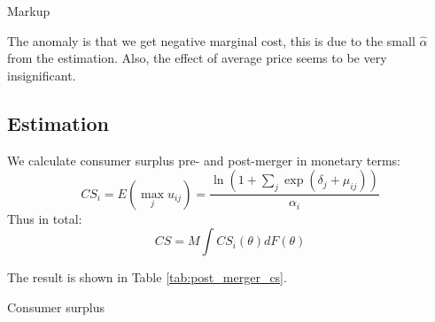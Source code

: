\documentclass[12pt]{article}[margin=1in]
\begin{document}
\begin{table}[h!]
    \fontsize{10pt}{12pt}\selectfont
    \centering
    
    \caption{Markup}
    \label{tab:post_merger_mean}
\end{table}
The anomaly is that we get
negative marginal cost, this is due to the small $\hat{\alpha}$ from the
estimation. Also, the effect of average price seems to be very insignificant.

\subsection{Estimation}
We calculate consumer surplus pre- and post-merger in monetary terms:
\begin{equation*}
    CS_i = E(\max_j u_{ij}) = \frac{\ln(1 + \sum_j \exp(\delta_j + \mu_{ij}))}{\alpha_i}
\end{equation*}
Thus in total:
\begin{equation*}
    CS = M \int CS_i(\theta) dF(\theta)
\end{equation*}

The result is shown in Table \ref{tab:post_merger_cs}.
\begin{table}[h!]
    \fontsize{10pt}{12pt}\selectfont
    \centering
    
    \caption{Consumer surplus}
    \label{tab:post_merger_cs}
\end{table}

\pagebreak
\newpage

\end{document}
